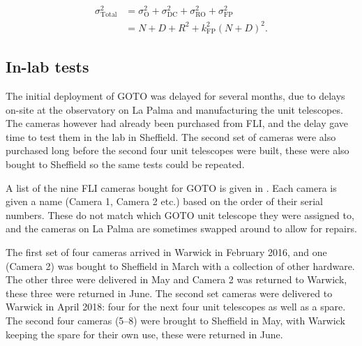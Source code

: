 \begin{colsection}
\begin{colsection}
\begin{equation}
    \begin{split}
        \sigma_\text{Total}^2 & = \sigma_\text{O}^2 +
                                  \sigma_\text{DC}^2 +
                                  \sigma_\text{RO}^2 +
                                  \sigma_\text{FP}^2 \\
                              & = N + D + R^2 + k_\text{FP}^2{(N+D)}^2.
    \end{split}
    \label{eq:noise}
\end{equation}

\end{colsection}

\subsection{In-lab tests}
\label{sec:camera_tests}
\begin{colsection}

The initial deployment of GOTO was delayed for several months, due to delays on-site at the observatory on La Palma and manufacturing the unit telescopes. The cameras however had already been purchased from FLI, and the delay gave time to test them in the lab in Sheffield. The second set of cameras were also purchased long before the second four unit telescopes were built, these were also bought to Sheffield so the same tests could be repeated.

A list of the nine FLI cameras bought for GOTO is given in . Each camera is given a name (Camera 1, Camera 2 etc.) based on the order of their serial numbers. These do not match which GOTO unit telescope they were assigned to, and the cameras on La Palma are sometimes swapped around to allow for repairs.

The first set of four cameras arrived in Warwick in February 2016, and one (Camera 2) was bought to Sheffield in March with a collection of other hardware. The other three were delivered in May and Camera 2 was returned to Warwick, these three were returned in June. The second set cameras were delivered to Warwick in April 2018: four for the next four unit telescopes as well as a spare. The second four cameras (5--8) were brought to Sheffield in May, with Warwick keeping the spare for their own use, these were returned in June.


\end{colsection}
\end{colsection}
